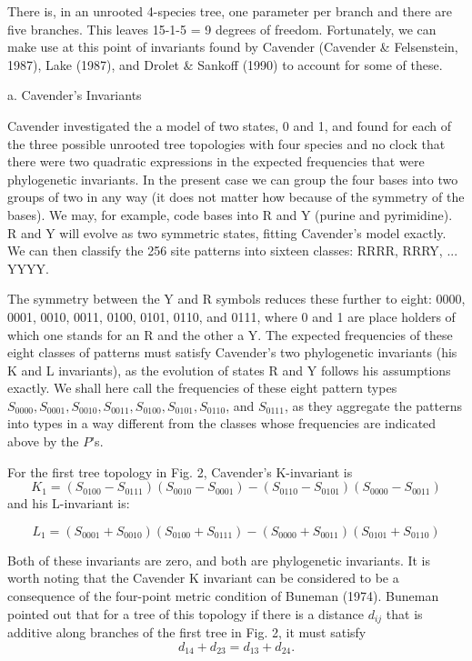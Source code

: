 \medskip

There is, in an unrooted 4-species tree, one parameter per branch and there
are five branches.  This leaves 15-1-5 = 9 degrees of freedom.  Fortunately,
we can make use at this point of invariants found by Cavender (Cavender \&  
Felsenstein, 1987), Lake (1987), and Drolet \& Sankoff (1990) to account
for some of these.
\bigskip

a. Cavender's Invariants
\medskip

Cavender investigated the a model of two states, 0 and 1,
and found for each of the three possible unrooted tree topologies with four
species and no clock that there were two quadratic expressions in the expected
frequencies that were phylogenetic invariants.  In the present case we can
group the four bases into two groups of two in any way (it does not matter
how because of the symmetry of the bases).  We may, for example, code bases
into R and Y (purine and pyrimidine).  R and Y will evolve as two symmetric
states, fitting Cavender's model exactly.  We can then classify the 256 site
patterns into sixteen classes: RRRR, RRRY, ... YYYY.

The symmetry between
the Y and R symbols reduces these further to eight: 0000, 0001, 0010, 0011,
0100, 0101, 0110, and 0111, where 0 and 1 are place holders of which one 
stands for an R and the other a Y.  The
expected frequencies of these eight classes of patterns must satisfy Cavender's
two phylogenetic invariants (his K and L invariants), as the evolution of
states R and Y follows his assumptions exactly.  We shall here call the
frequencies of these eight pattern types $S_{0000}, S_{0001}, S_{0010}, 
S_{0011}, S_{0100}, S_{0101}, S_{0110}$, and $S_{0111}$, as they
aggregate the patterns into types in a way different from the classes
whose frequencies are indicated above by the $P$'s.

For the first tree topology in Fig. 2, Cavender's K-invariant is
\begin{equation} %
K_1 = (S_{0100}-S_{0111})(S_{0010}-S_{0001}) - (S_{0110}-S_{0101})(S_{0000}-S_{0011})
\end{equation}
and his L-invariant is:

\begin{equation} %
L_1  =  (S_{0001} + S_{0010})(S_{0100} + S_{0111}) - (S_{0000} + S_{0011})(S_{0101} + S_{0110})
\end{equation}

Both of these invariants are zero, and both are phylogenetic invariants.  It
is worth noting that the Cavender K invariant can be considered to be a
consequence of the four-point metric condition of Buneman (1974).   Buneman
pointed out that for a tree of this topology if there is a distance
$d_{ij}$ that is additive along branches of the first tree in Fig. 2,
it must satisfy
\begin{equation} %
   d_{14} + d_{23} = d_{13} + d_{24}.
\end{equation}

